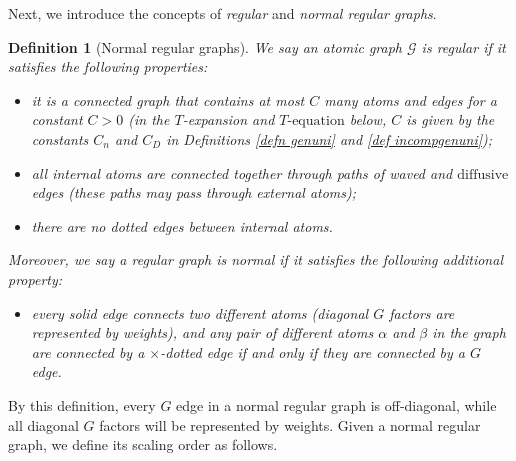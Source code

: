 \documentclass{article}
\newcommand{\1}{\mathds{1}}
\numberwithin{equation}{section}
\newcommand{\al}{\alpha}
\renewcommand{\cal}{\mathcal}
\newcommand{\dashed}{\text{diffusive}}
\theoremstyle{plain} %
\newtheorem{definition}[theorem]{Definition}
\theoremstyle{remark}
\newcommand{\cob}{\color{purple}}
\newcommand{\nc}{\normalcolor}
\newcommand{\incomp}{{\text{$T$-equation}}}
\begin{document}
Next, we introduce the concepts of \emph{regular} and \emph{normal regular graphs}.

\begin{definition}[Normal regular graphs]  \label{defnlvl0} %
	We say an atomic graph $\cal G$ is \emph{regular} if it satisfies the following properties:
	\begin{itemize}
		\item[(i)] it is a connected graph that contains at most $C$ many atoms and edges for a constant $C>0$ (in the $T$-expansion and $\incomp$ below, $C$ is given by the constants $C_n$ and $C_D$ in Definitions \ref{defn genuni} and \ref{def incompgenuni});
		\item[(ii)] all internal atoms are connected together through paths of waved and $\dashed$ edges (these paths may pass through external atoms);
		\item[(iii)] there are no dotted edges between internal atoms.
	\end{itemize}
	Moreover, we say a regular graph is \emph{normal} if it satisfies the following additional property:
	\begin{itemize}
		\item[(iv)] every solid edge connects two different atoms (diagonal $G$ factors are represented by weights), and any pair of different atoms $\al$ and $\beta$ in the graph are connected by a $\times$-dotted edge \emph{if and only if} they are connected by a $G$ edge.
	\end{itemize}
\end{definition}



By this definition, every $G$ edge in a normal regular graph is off-diagonal, while all diagonal $G$ factors will be represented by weights. Given a normal regular graph, we define its scaling order as follows. 
\end{document}
